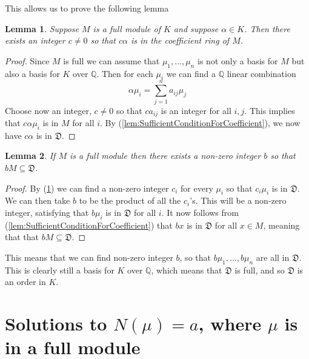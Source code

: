 \documentclass{article}
\newtheorem{lemma}{Lemma}[section]
\newcommand{\mfrak}[1]{\mathfrak{#1}}
\newcommand{\mbb}[1]{\mathbb{#1}}
\begin{document}
This allows us to prove the following lemma 

\begin{lemma} \label{lem:ElementsCanBeScaledToBeInCoefficientRing}
    Suppose $M$ is a full module of $K$ and suppose $\alpha \in K$. Then there exists an integer $c \neq 0$ so that $c \alpha$ is in the coefficient ring of $M$.
\end{lemma}

\begin{proof}
    
Since $M$ is full we can assume that $\mu_1, ..., \mu_n$ is not only a basis for $M$ but also a basis for $K$ over $\mbb Q$. Then for each $\mu_i$ we can find a $\mbb Q$ linear combination
$$\alpha \mu_i = \sum_{j=1}^n a_{ij} \mu_j$$
Choose now an integer, $c \neq 0$ so that $c a_{ij}$ is an integer for all $i,j$. This implies that $c \alpha \mu_i$ is in $M$ for all $i$. By (\ref{lem:SufficientConditionForCoefficient}), we now have $c \alpha$ is in $\mfrak D$. 
\end{proof}

\begin{lemma}\label{lem:ModuleCanBeScaledToFitInsideCoefficientRing}
    If $M$ is a full module then there exists a non-zero integer $b$ so that $bM \subseteq \mfrak D$.
    \end{lemma}
    \begin{proof}
    By (\ref{lem:ElementsCanBeScaledToBeInCoefficientRing}) we can find a non-zero integer $c_i$ for every $\mu_i$ so that $c_i \mu_i$ is in $\mfrak D$. We can then take $b$ to be the product of all the $c_i$'s. This will be a non-zero integer, satisfying that $b \mu_i$ is in $\mfrak D$ for all $i$. It now follows from (\ref{lem:SufficientConditionForCoefficient}) that $bx$ is in $\mfrak D$ for all $x \in M$, meaning that 
    that $b M \subseteq \mfrak D$.
\end{proof}


This means that we can find non-zero integer $b$, so that $b \mu_1, ..., b \mu_n$ are all in $\mfrak D$. This is clearly still a basis for $K$ over $\mbb Q$, which means that $\mfrak D$ is full, and so $\mfrak D$ is an order in $K$.



\section{Solutions to $N(\mu) = a$, where $\mu$ is in a full module}
\end{document}
